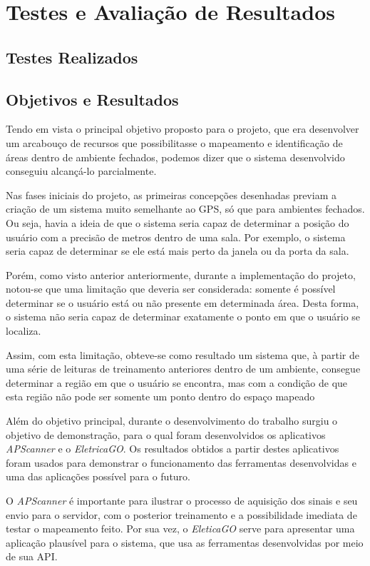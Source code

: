 \chapter{Testes e Avaliação de Resultados}

\section{Testes Realizados}

\section{Objetivos e Resultados}
Tendo em vista o principal objetivo proposto para o projeto, que era desenvolver um arcabouço de recursos que possibilitasse o mapeamento e identificação de áreas dentro de ambiente fechados, podemos dizer que o sistema desenvolvido conseguiu alcançá-lo parcialmente.\par
Nas fases iniciais do projeto, as primeiras concepções desenhadas previam a criação de um sistema muito semelhante ao GPS, só que para ambientes fechados. Ou seja, havia a ideia de que o sistema seria capaz de determinar a posição do usuário com a precisão de metros dentro de uma sala. Por exemplo, o sistema seria capaz de determinar se ele está mais perto da janela ou da porta da sala.\par
Porém, como visto anterior anteriormente, durante a implementação do projeto, notou-se que uma limitação que deveria ser considerada: somente é possível determinar se o usuário está ou não presente em determinada área. Desta forma, o sistema não seria capaz de determinar exatamente o ponto em que o usuário se localiza.\par
Assim, com esta limitação, obteve-se como resultado um sistema que, à partir de uma série de leituras de treinamento anteriores dentro de um ambiente, consegue determinar a região em que o usuário se encontra, mas com a condição de que esta região não pode ser somente um ponto dentro do espaço mapeado\par
Além do objetivo principal, durante o desenvolvimento do trabalho surgiu o objetivo de demonstração, para o qual foram desenvolvidos os aplicativos \textit{APScanner} e o \textit{EletricaGO}. Os resultados obtidos a partir destes aplicativos foram usados para demonstrar o funcionamento das ferramentas desenvolvidas e uma das aplicações possível para o futuro.\par
O \textit{APScanner} é importante para ilustrar o processo de aquisição dos sinais e seu envio para o servidor, com o posterior treinamento e a possibilidade imediata de testar o mapeamento feito. Por sua vez, o \textit{EleticaGO} serve para apresentar uma aplicação plausível para o sistema, que usa as ferramentas desenvolvidas por meio de sua API. \par
